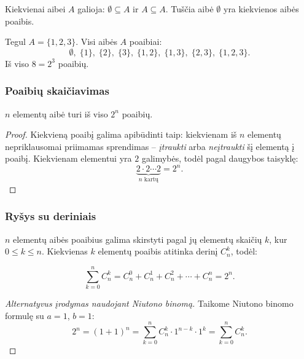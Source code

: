 \begin{remark}
Kiekvienai aibei $A$ galioja: $\emptyset \subseteq A$ ir $A \subseteq A$. Tuščia aibė $\emptyset$ yra kiekvienos aibės poaibis.
\end{remark}

\begin{example}
Tegul $A = \{1, 2, 3\}$. Visi aibės $A$ poaibiai:
\[
\emptyset,\;\{1\},\;\{2\},\;\{3\},\;\{1,2\},\;\{1,3\},\;\{2,3\},\;\{1,2,3\}.
\]
Iš viso $8 = 2^3$ poaibių.
\end{example}

\subsubsection*{Poaibių skaičiavimas}

\begin{theorem}
$n$ elementų aibė turi iš viso $2^n$ poaibių.
\end{theorem}

\begin{proof}
Kiekvieną poaibį galima apibūdinti taip: kiekvienam iš $n$ elementų nepriklausomai priimamas sprendimas -- \emph{įtraukti} arba \emph{neįtraukti} šį elementą į poaibį. Kiekvienam elementui yra $2$ galimybės, todėl pagal daugybos taisyklę:
\[
\underbrace{2 \cdot 2 \cdots 2}_{n \text{ kartų}} = 2^n.
\]
\end{proof}

\subsubsection*{Ryšys su deriniais}

$n$ elementų aibės poaibius galima skirstyti pagal jų elementų skaičių $k$, kur $0 \leq k \leq n$. Kiekvienas $k$ elementų poaibis atitinka derinį $C_n^k$, todėl:

\[
\sum_{k=0}^{n} C_n^k = C_n^0 + C_n^1 + C_n^2 + \cdots + C_n^n = 2^n.
\]

\begin{proof}[Alternatyvus įrodymas naudojant Niutono binomą]
Taikome Niutono binomo formulę su $a = 1$, $b = 1$:
\[
2^n = (1+1)^n = \sum_{k=0}^{n} C_n^k \cdot 1^{n-k} \cdot 1^k = \sum_{k=0}^{n} C_n^k.
\]
\end{proof}

